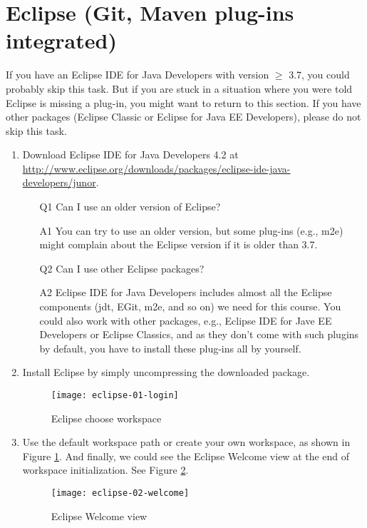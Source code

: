 
\section{Eclipse (Git, Maven plug-ins integrated)}

If you have an Eclipse IDE for Java Developers with version $\ge$ 3.7, you could probably skip this task. But if you are stuck in a situation where you were told Eclipse is missing a plug-in, you might want to return to this section. If you have other packages (Eclipse Classic or Eclipse for Java EE Developers), please do not skip this task.

\begin{enumerate}
\item Download Eclipse IDE for Java Developers 4.2 at \url{http://www.eclipse.org/downloads/packages/eclipse-ide-java-developers/junor}.

\begin{framed}
\begin{itemize}
\item[Q1] Can I use an older version of Eclipse?
\item[A1] You can try to use an older version, but some plug-ins (e.g., m2e) might complain about the Eclipse version if it is older than 3.7.
\item[Q2] Can I use other Eclipse packages?
\item[A2] Eclipse IDE for Java Developers includes almost all the Eclipse components (jdt, EGit, m2e, and so on) we need for this course. You could also work with other packages, e.g., Eclipse IDE for Jave EE Developers or Eclipse Classics, and as they don't come with such plugins by default, you have to install these plug-ins all by yourself.
\end{itemize}
\end{framed}

\item Install Eclipse by simply uncompressing the downloaded package.

\begin{figure}[t]
\centering
\texttt{[image: eclipse-01-login]}
\caption{Eclipse choose workspace\label{eclipse-01-login}}
\end{figure}

\item Use the default workspace path or create your own workspace, as shown in Figure \ref{eclipse-01-login}. And finally, we could see the Eclipse Welcome view at the end of workspace initialization. See Figure \ref{eclipse-02-welcome}.

\begin{figure}[t]
\centering
\texttt{[image: eclipse-02-welcome]}
\caption{Eclipse Welcome view\label{eclipse-02-welcome}}
\end{figure}

\end{enumerate}
